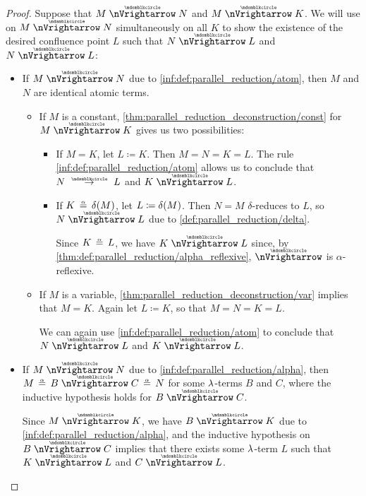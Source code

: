 \begin{proof}
   Suppose that \( M \ppred N \) and \( M \ppred K \). We will use  on \( M \ppred N \) simultaneously on all \( K \) to show the existence of the desired confluence point \( L \) such that \( N \ppred L \) and \( N \ppred L \):
  \begin{itemize}
    \item If \( M \ppred N \) due to \ref{inf:def:parallel_reduction/atom}, then \( M \) and \( N \) are identical atomic terms.

    \begin{itemize}
      \item If \( M \) is a constant, \cref{thm:parallel_reduction_deconstruction/const} for \( M \ppred K \) gives us two possibilities:
      \begin{itemize}
        \item If \( M = K \), let \( L \coloneqq K \). Then \( M = N = K = L \). The rule \ref{inf:def:parallel_reduction/atom} allows us to conclude that \( N \pred L \) and \( K \ppred L \).

        \item If \( K \aequiv \op*{\delta}(M) \), let \( L \coloneqq \op*{\delta}(M) \). Then \( N = M \) \( \delta \)-reduces to \( L \), so \( N \ppred L \) due to \ref{def:parallel_reduction/delta}.

       Since \( K \aequiv L \), we have \( K \ppred L \) since, by \cref{thm:def:parallel_reduction/alpha_reflexive}, \( {\ppred} \) is \( \alpha \)-reflexive.
      \end{itemize}

      \item If \( M \) is a variable, \cref{thm:parallel_reduction_deconstruction/var} implies that \( M = K \). Again let \( L \coloneqq K \), so that \( M = N = K = L \).

      We can again use \ref{inf:def:parallel_reduction/atom} to conclude that \( N \ppred L \) and \( K \ppred L \).
    \end{itemize}

    \item If \( M \ppred N \) due to \ref{inf:def:parallel_reduction/alpha}, then \( M \aequiv B \ppred C \aequiv N \) for some \( {\mathrm \lambda} \)-terms \( B \) and \( C \), where the inductive hypothesis holds for \( B \ppred C \).

    Since \( M \ppred K \), we have \( B \ppred K \) due to \ref{inf:def:parallel_reduction/alpha}, and the inductive hypothesis on \( B \ppred C \) implies that there exists some \( {\mathrm \lambda} \)-term \( L \) such that \( K \ppred L \) and \( C \ppred L \).


\end{itemize}
\end{proof}
